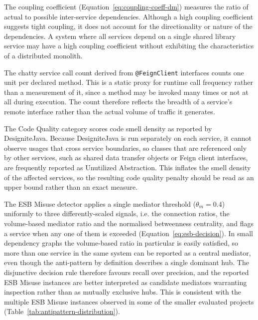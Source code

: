 \par The coupling coefficient (Equation~\ref{eq:coupling-coeff-dm}) measures the ratio of actual to possible inter-service dependencies. Although a high coupling coefficient suggests tight coupling, it does not account for the directionality or nature of the dependencies. A system where all services depend on a single shared library service may have a high coupling coefficient without exhibiting the characteristics of a distributed monolith.

\par The chatty service call count derived from \texttt{@FeignClient} interfaces counts one unit per declared method. This is a static proxy for runtime call frequency rather than a measurement of it, since a method may be invoked many times or not at all during execution. The count therefore reflects the breadth of a service's remote interface rather than the actual volume of traffic it generates.

\par The Code Quality category scores code smell density as reported by DesigniteJava. Because DesigniteJava is run separately on each service, it cannot observe usages that cross service boundaries, so classes that are referenced only by other services, such as shared data transfer objects or Feign client interfaces, are frequently reported as Unutilized Abstraction. This inflates the smell density of the affected services, so the resulting code quality penalty should be read as an upper bound rather than an exact measure.

\par The ESB Misuse detector applies a single mediator threshold ($\theta_m = 0.4$) uniformly to three differently-scaled signals, i.e. the connection ratios, the volume-based mediator ratio and the normalised betweenness centrality, and flags a service when any one of them is exceeded (Equation~\ref{eq:esb-decision}). In small dependency graphs the volume-based ratio in particular is easily satisfied, so more than one service in the same system can be reported as a central mediator, even though the anti-pattern by definition describes a single dominant hub. The disjunctive decision rule therefore favours recall over precision, and the reported ESB Misuse instances are better interpreted as candidate mediators warranting inspection rather than as mutually exclusive hubs. This is consistent with the multiple ESB Misuse instances observed in some of the smaller evaluated projects (Table~\ref{tab:antipattern-distribution}).

